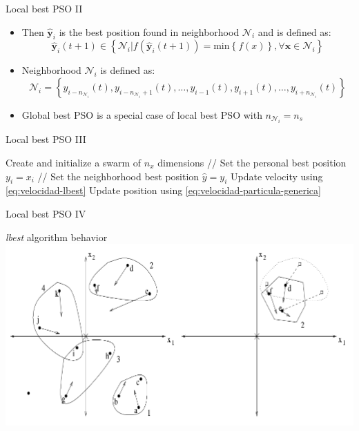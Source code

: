 \documentclass[aspectratio=169,compress,10pt]{beamer}
\begin{document}
\begin{frame}{Local best PSO II}
\begin{itemize}
	\item Then $\mathbf{\hat{y}}_i$ is the best position found in neighborhood $\mathcal{N}_i$ and is defined as:
$$
\mathbf{\hat{y}}_i (t+1) \in \left \{ \mathcal{N}_i | f( \mathbf{\hat{y}}_i (t+1) ) = \text{min} \left \{ f(x) \right \}, \forall \mathbf{x} \in \mathcal{N}_i \right \}
$$
\item Neighborhood $\mathcal{N}_i$ is defined as:
$$
\mathcal{N}_i = \left \{ y_{{i-n}_{\mathcal{N}_i}}(t), y_{i-n_{\mathcal{N}_i}+1 }(t), \ldots, y_{i-1}(t), y_{i+1}(t), \ldots, y_{i+n_{\mathcal{N}_i} }(t) \right \}
$$
\item Global best PSO is a special case of local best PSO with $n_{\mathcal{N}_i} = n_s$
\end{itemize}
\end{frame}

\begin{frame}{Local best PSO III}
\begin{algorithm}[H]
\scriptsize
\begin{algorithmic}[1] 
\STATE Create and initialize a swarm of $n_x$ dimensions
\REPEAT
		\STATE // Set the personal best position
			\STATE $y_i = x_i$
		\ENDIF
		\STATE // Set the neighborhood best position
			\STATE $\hat{y} = y_i$
		\ENDIF
	\ENDFOR
		\STATE Update velocity using \ref{eq:velocidad-lbest}
		\STATE Update position using \ref{eq:velocidad-particula-generica}
	\ENDFOR
{}
\end{algorithmic} 
\caption{Algoritmo PSO lbest} 
\label{alg:algoritmo-pso-lbest}
\end{algorithm}
\end{frame}

\begin{frame}{Local best PSO IV}
\begin{block}{\emph{lbest} algorithm behavior}
\centering
\includegraphics[scale=0.25]{../resources/lbest-behavior}
\end{block}
\end{frame}
\end{document}
